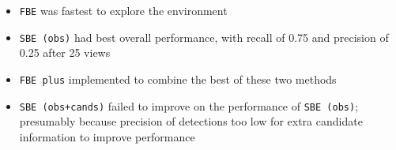 
\begin{itemize}
	\item \texttt{FBE} was fastest to explore the environment
	\item \texttt{SBE (obs)} had best overall performance, with recall of 0.75 and precision of 0.25 after 25 views
	\item \texttt{FBE plus} implemented to combine the best of these two methods
	\item \texttt{SBE (obs+cands)} failed to improve on the performance of \texttt{SBE (obs)}; presumably because precision of detections too low for extra candidate information to improve performance
\end{itemize}